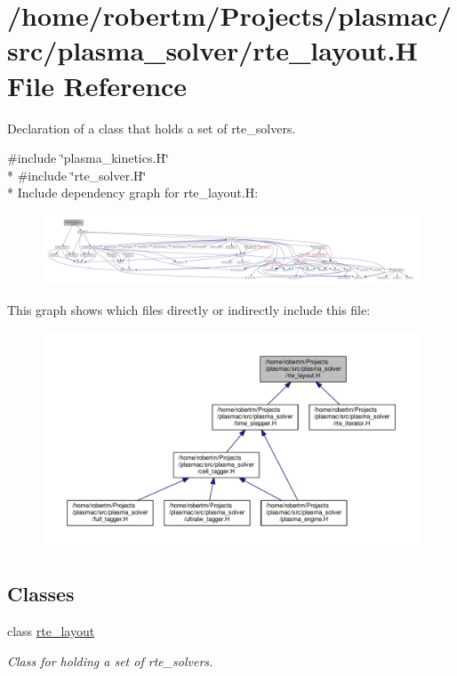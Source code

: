 \hypertarget{rte__layout_8H}{}\section{/home/robertm/\+Projects/plasmac/src/plasma\+\_\+solver/rte\+\_\+layout.H File Reference}
\label{rte__layout_8H}


Declaration of a class that holds a set of rte\+\_\+solvers.  


{\ttfamily \#include \char`\"{}plasma\+\_\+kinetics.\+H\char`\"{}}\\*
{\ttfamily \#include \char`\"{}rte\+\_\+solver.\+H\char`\"{}}\\*
Include dependency graph for rte\+\_\+layout.\+H\+:\nopagebreak
\begin{figure}[H]
\begin{center}
\leavevmode
\includegraphics[width=350pt]{rte__layout_8H__incl}
\end{center}
\end{figure}
This graph shows which files directly or indirectly include this file\+:\nopagebreak
\begin{figure}[H]
\begin{center}
\leavevmode
\includegraphics[width=350pt]{rte__layout_8H__dep__incl}
\end{center}
\end{figure}
\subsection*{Classes}
\begin{DoxyCompactItemize}
\item 
class \hyperlink{classrte__layout}{rte\+\_\+layout}
\begin{DoxyCompactList}\small\item\em Class for holding a set of rte\+\_\+solvers. \end{DoxyCompactList}\end{DoxyCompactItemize}


